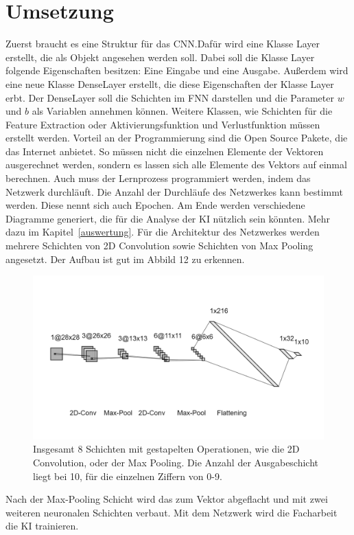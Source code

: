 \documentclass[11pt]{article}
\begin{document}
\section{Umsetzung}
Zuerst braucht es eine Struktur für das CNN.\@ Dafür wird eine Klasse Layer erstellt, die als Objekt angesehen werden soll. Dabei soll die Klasse Layer folgende
Eigenschaften besitzen: Eine Eingabe und eine Ausgabe. Außerdem wird eine neue Klasse DenseLayer erstellt, die diese Eigenschaften der Klasse Layer erbt.
Der DenseLayer soll die Schichten im FNN darstellen und die Parameter $w$ und $b$ als Variablen annehmen können. Weitere Klassen, wie Schichten für die
Feature Extraction oder Aktivierungsfunktion und Verlustfunktion müssen erstellt werden. Vorteil an der Programmierung sind die Open Source Pakete, die das
Internet anbietet. So müssen nicht die einzelnen Elemente der Vektoren ausgerechnet werden, sondern es lassen sich alle Elemente des Vektors auf einmal berechnen.
Auch muss der Lernprozess programmiert werden, indem das Netzwerk durchläuft. Die Anzahl der Durchläufe des Netzwerkes kann bestimmt werden.
Diese nennt sich auch Epochen. Am Ende werden verschiedene Diagramme generiert, die für die Analyse der KI nützlich sein könnten.
Mehr dazu im Kapitel~\ref{auswertung}. Für die Architektur des Netzwerkes werden mehrere Schichten von 2D Convolution sowie Schichten von Max Pooling angesetzt.
Der Aufbau ist gut im Abbild 12 zu erkennen.
\begin{figure}[h]
    \centering
    \includegraphics[width=325pt, keepaspectratio]{images/cnn}
    \caption[Architektur eines CNNs]{Insgesamt 8 Schichten mit gestapelten Operationen, wie die 2D Convolution, oder der Max Pooling.
    Die Anzahl der Ausgabeschicht liegt bei 10, für die einzelnen Ziffern von 0-9.}
\end{figure}
Nach der Max-Pooling Schicht wird das zum Vektor abgeflacht und mit zwei weiteren neuronalen Schichten verbaut.
Mit dem Netzwerk wird die Facharbeit die KI trainieren.
\end{document}
